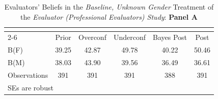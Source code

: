 \begin{table}[htbp]\centering
\caption{Evaluators' Beliefs in the \textit{Baseline, Unknown Gender} Treatment of the \textit{Evaluator (Professional Evaluators) Study}: \textbf{Panel A}}
\begin{tabular}{l*{5}{c}}
\hline\hline
                &\multicolumn{5}{c}{}                             \\\cmidrule(lr){2-6}
                &\multicolumn{1}{c}{Prior}&\multicolumn{1}{c}{Overconf}&\multicolumn{1}{c}{Underconf}&\multicolumn{1}{c}{Bayes Post}&\multicolumn{1}{c}{Post}\\
\hline
B(F)            &    39.25&    42.87&    49.78&    40.22&    50.46\\
B(M)            &    38.03&    43.90&    39.56&    36.49&    36.61\\
\hline
Observations    &      391&      391&      391&      388&      391\\
\hline\hline
\multicolumn{6}{l}{\footnotesize SEs are robust}\\
\end{tabular}
\end{table}
